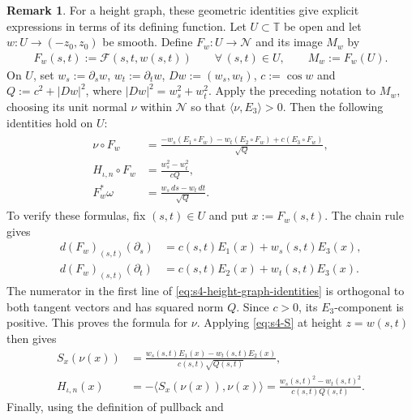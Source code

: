 \documentclass[a4paper,11pt,oneside,reqno]{amsart}
\numberwithin{equation}{section}
\theoremstyle{definition}
\newtheorem{remark}[theorem]{Remark}
\begin{document}
\begin{remark}
    For a height graph, these geometric identities give explicit
    expressions in terms of its defining function. Let
    $U\subset\mathbb{T}$ be open and let
    $w:U\to(-z_0,z_0)$ be smooth. Define
    $F_w:U\to\mathcal{N}$ and its image $M_w$ by
    \begin{align*}
        F_w(s,t):=\mathcal{F}(s,t,w(s,t))
        \qquad\forall\,(s,t)\in U,
        \qquad M_w:=F_w(U).
    \end{align*}
    On $U$, set $w_s:=\partial_sw$, $w_t:=\partial_tw$,
    $Dw:=(w_s,w_t)$, $c:=\cos w$ and $Q:=c^2+|Dw|^2$,
    where $|Dw|^2=w_s^2+w_t^2$. Apply the preceding notation
    to $M_w$, choosing its unit normal $\nu$ within $\mathcal{N}$
    so that $\langle\nu,E_3\rangle>0$. Then the following
    identities hold on $U$:
    \begin{align}
        \label{eq:s4-height-graph-identities}
        \begin{split}
            \nu\circ F_w
            &=\frac{-w_s(E_1\circ F_w)-w_t(E_2\circ F_w)
            +c(E_3\circ F_w)}{\sqrt Q},\\
            H_{\iota,n}\circ F_w&=\frac{w_s^2-w_t^2}{cQ},\\
            F_w^*\omega&=\frac{w_s\,ds-w_t\,dt}{\sqrt Q}.
        \end{split}
    \end{align}
    To verify these formulas, fix $(s,t)\in U$ and put
    $x:=F_w(s,t)$. The chain rule gives
    \begin{align*}
        d(F_w)_{(s,t)}(\partial_s)
        &=c(s,t)E_1(x)+w_s(s,t)E_3(x),\\
        d(F_w)_{(s,t)}(\partial_t)
        &=c(s,t)E_2(x)+w_t(s,t)E_3(x).
    \end{align*}
    The numerator in the first line of
    \eqref{eq:s4-height-graph-identities} is orthogonal to
    both tangent vectors and has squared norm $Q$. Since
    $c>0$, its $E_3$-component is positive. This proves the
    formula for $\nu$. Applying \eqref{eq:s4-S} at height
    $z=w(s,t)$ then gives
    \begin{align*}
        S_x(\nu(x))
        &=\frac{w_s(s,t)E_1(x)-w_t(s,t)E_2(x)}
        {c(s,t)\sqrt{Q(s,t)}},\\
        H_{\iota,n}(x)
        &=-\langle S_x(\nu(x)),\nu(x)\rangle
        =\frac{w_s(s,t)^2-w_t(s,t)^2}{c(s,t)Q(s,t)}.
    \end{align*}
    Finally, using the definition of pullback and

\end{remark}
\end{document}
